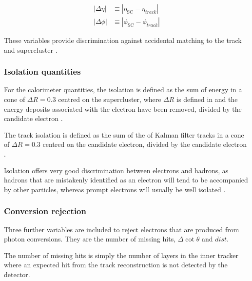 \begin{align}
|\Delta\eta| &\equiv |\eta_{\text{SC}} - \eta_{track}|\\
|\Delta\phi| &\equiv |\phi_{\text{SC}} - \phi_{track}|
\end{align}

These variables provide discrimination against accidental matching to the track and
supercluster \cite{baffioni2009identification}. 


\subsubsection{Isolation quantities}
For the calorimeter quantities, the isolation is defined as the sum of energy in
a cone of $\Delta R = 0.3$ centred on the supercluster, where $\Delta R$ is
defined in  and the energy deposits associated with the
electron have been removed, divided by the candidate electron \Pt.

The track isolation is defined as the sum of the \Pt of Kalman filter tracks in
a cone of $\Delta R = 0.3 $ centred on the candidate electron, divided by the
candidate electron \Pt.

Isolation offers very good discrimination between electrons and hadrons, as
hadrons that are mistakenly identified as an electron will tend to be
accompanied by other particles, whereas prompt electrons will usually be well
isolated \cite{baffioni2009identification,nikos}.

\subsubsection{Conversion rejection}
Three further variables are included to reject electrons that are produced from
photon conversions. They are the number of missing hits, $\Delta\cot\theta$ and
$dist$. 

The number of missing hits is simply the number of layers in the inner
tracker where an expected hit from the track reconstruction is not detected by
the detector.

